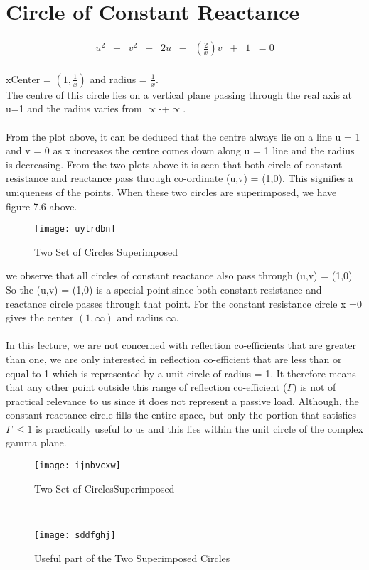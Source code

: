 \section{Circle of Constant Reactance}
\begin{align*}
u^2\;\;+\;\;v^2\;\;-\;\;2u\;\;-\;\;(\frac{2}{x})v\;\;+\;\;1\;\;=0
\end{align*}\\
xCenter = $(1,\frac{1}{x})$ and radius = $\frac{1}{x}$. \\
The centre of this circle lies on a vertical plane passing through the real axis at u=1 and the radius varies from $ \propto $-+$ \propto $.\\\\
From the plot above, it can be deduced that the centre always lie on a line u = 1 and v = 0 as x increases the centre comes down along u = 1 line and the radius is decreasing.  
From the two plots above it is seen that both circle of constant resistance and reactance pass through co-ordinate (u,v) = (1,0). This signifies a uniqueness of the points.  When these two circles are superimposed, we have figure 7.6 above.

\begin{figure}[h]
	\centering
	\texttt{[image: uytrdbn]}
	\caption{Two Set of Circles Superimposed}
	\label{fig:uytrdbn}
\end{figure}
we observe that all circles of constant reactance also pass through (u,v) = (1,0)\\
So the (u,v) = (1,0) is a special point.since both constant resistance and reactance circle passes through that point. For the constant resistance circle x =0 gives the center $(1,\infty)$ and radius $\infty$. \\\\ 
In this lecture, we are not concerned with reflection co-efficients that are greater than one, we are only interested in reflection co-efficient that are less than or equal to 1 which is represented by a unit circle of radius = 1. It therefore means that any other point outside this range of reflection co-efficient ($\Gamma$) is not of practical relevance to us since it does not represent a passive load.  Although, the constant reactance circle fills the entire space, but only the portion that satisfies $ \Gamma\ \leq 1$ is practically useful to us and this lies within the unit circle of the complex gamma plane.\\
\begin{figure}[h]
	\centering
	\texttt{[image: ijnbvcxw]}
	\caption{Two Set of CirclesSuperimposed}
	\label{fig:ijnbvcxw}
\end{figure}\\
\begin{figure}[h]
	\centering
	\texttt{[image: sddfghj]}
	\caption{Useful part of the Two Superimposed Circles}
	\label{fig:sddfghj}
\end{figure}

